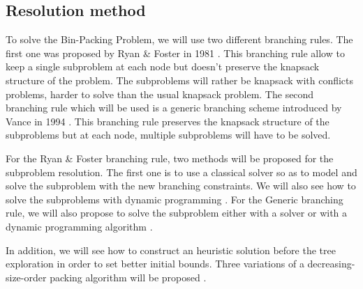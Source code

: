 \subsection{Resolution method}

To solve the Bin-Packing Problem, we will use two different branching rules. The first one was proposed by Ryan \& Foster in 1981 \cite{ryan1981rn}. This branching rule allow to keep a single subproblem at each node but doesn't preserve the knapsack structure of the problem. The subproblems will rather be knapsack with conflicts problems, harder to solve than the usual knapsack problem. The second branching rule which will be used is a generic branching scheme introduced by Vance in 1994 \cite{vance1994solving}. This branching rule preserves the knapsack structure of the subproblems but at each node, multiple subproblems will have to be solved.

For the Ryan \& Foster branching rule, two methods will be proposed for the subproblem resolution. The first one is to use a classical solver so as to model and solve the subproblem with the new branching constraints. We will also see how to solve the subproblems with dynamic programming \cite{toth1980dynamic}. For the Generic branching rule, we will also propose to solve the subproblem either with a solver or with a dynamic programming algorithm \cite{sadykov2013bin}.

In addition, we will see how to construct an heuristic solution before the tree exploration in order to set better initial bounds. Three  variations of a decreasing-size-order packing algorithm will be proposed \cite{bhatia2009better}.